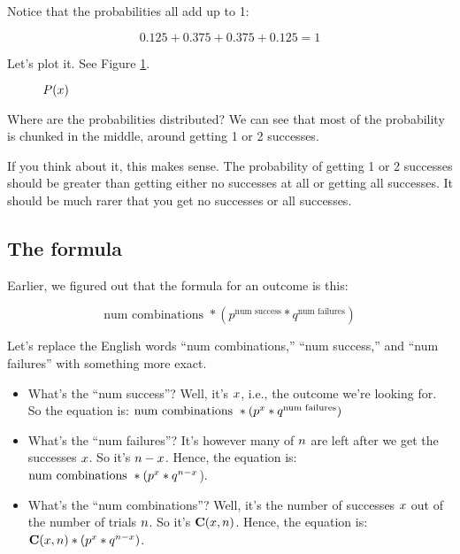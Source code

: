 \documentclass[../../../main.tex]{subfiles}
\begin{document}
\noindent
Notice that the probabilities all add up to 1:

\begin{equation*}
    0.125 + 0.375 + 0.375 + 0.125 = 1
\end{equation*}

\noindent
Let's plot it. See Figure \ref{plot:example-1}.

\begin{figure}[ht]
  \caption{\label{plot:example-1} $\Probability{\RandVarVal/}$}
\end{figure}

Where are the probabilities distributed? We can see that most of the probability is chunked in the middle, around getting 1 or 2 successes. 

If you think about it, this makes sense. The probability of getting 1 or 2 successes should be greater than getting either no successes at all or getting all successes. It should be much rarer that you get no successes or all successes.


\subsection{The formula}

Earlier, we figured out that the formula for an outcome is this:

\begin{equation*}
    \text{num combinations } * (p^{\text{num success}} * q^{\text{num failures}})
\end{equation*}

Let's replace the English words ``num combinations,'' ``num success,'' and ``num failures'' with something more exact.

\begin{itemize}
  \item What's the ``num success''? Well, it's $\RandVarVal/$, i.e., the outcome we're looking for. So the equation is: $\text{num combinations } * (p^{\RandVarVal/} * q^{\text{num failures}})$
  \item What's the ``num failures''? It's however many of $\numTrials/$ are left after we get the successes $\RandVarVal/$. So it's $n - \RandVarVal/$. Hence, the equation is: $\text{num combinations } * (p^{\RandVarVal/} * q^{n - \RandVarVal/}$).
  \item What's the ``num combinations''? Well, it's the number of successes $\RandVarVal/$ out of the number of trials $\numTrials/$. So it's $\combs{\RandVarVal/}{n}$. Hence, the equation is: $\combs{\RandVarVal/}{n} * (p^{\RandVarVal/} * q^{n - \RandVarVal/})$.
\end{itemize}
\end{document}

